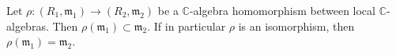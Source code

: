 Let $\rho: (R_1, \mathfrak{m}_1) \rightarrow (R_2, \mathfrak{m}_2)$ be a $\mathbb{C}$-algebra homomorphism between local $\mathbb{C}$-algebras. Then $\rho(\mathfrak{m}_1) \subset \mathfrak{m}_2$. If in particular $\rho$ is an isomorphism, then $\rho(\mathfrak{m}_1) = \mathfrak{m}_2$.
